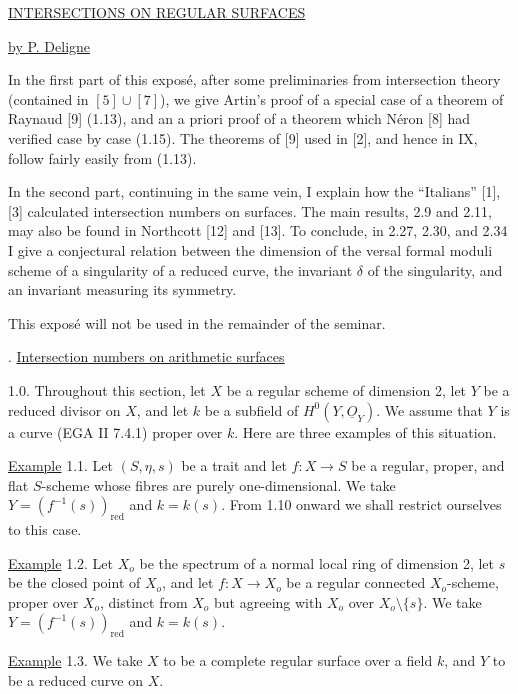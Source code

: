
\begin{center}
\underline{INTERSECTIONS ON REGULAR SURFACES}

\medskip
\underline{by P. Deligne}
\end{center}

In the first part of this exposé, after some preliminaries from intersection theory
(contained in $[5]\cup[7]$), we give Artin's proof of a special case of a theorem of
Raynaud [9] (1.13), and an a priori proof of a theorem which Néron [8] had verified
case by case (1.15).  The theorems of [9] used in [2], and hence in IX, follow fairly
easily from (1.13).

In the second part, continuing in the same vein, I explain how the ``Italians'' [1],
[3] calculated intersection numbers on surfaces.  The main results, 2.9 and 2.11,
may also be found in Northcott [12] and [13].  To conclude, in 2.27, 2.30, and 2.34
I give a conjectural relation between the dimension of the versal formal moduli
scheme of a singularity of a reduced curve, the invariant $\delta$ of the singularity,
and an invariant measuring its symmetry.

This exposé will not be used in the remainder of the seminar.

. \underline{Intersection numbers on arithmetic surfaces}

1.0. Throughout this section, let $X$ be a regular scheme of dimension 2, let $Y$ be
a reduced divisor on $X$, and let $k$ be a subfield of
$H^0(Y,\underline{O}_Y)$.  We assume that $Y$ is a curve (EGA II 7.4.1) proper over
$k$.  Here are three examples of this situation.

\underline{Example} 1.1. Let $(S,\eta,s)$ be a trait and let
$f:X\longrightarrow S$ be a regular, proper, and flat $S$-scheme whose fibres are
purely one-dimensional.  We take $Y=(f^{-1}(s))_{\mathrm{red}}$ and $k=k(s)$.  From
1.10 onward we shall restrict ourselves to this case.


\underline{Example} 1.2. Let $X_o$ be the spectrum of a normal local ring of
dimension 2, let $s$ be the closed point of $X_o$, and let
$f:X\longrightarrow X_o$ be a regular connected $X_o$-scheme, proper over $X_o$,
distinct from $X_o$ but agreeing with $X_o$ over $X_o\setminus\{s\}$.  We take
$Y=(f^{-1}(s))_{\mathrm{red}}$ and $k=k(s)$.

\underline{Example} 1.3. We take $X$ to be a complete regular surface over a field
$k$, and $Y$ to be a reduced curve on $X$.

